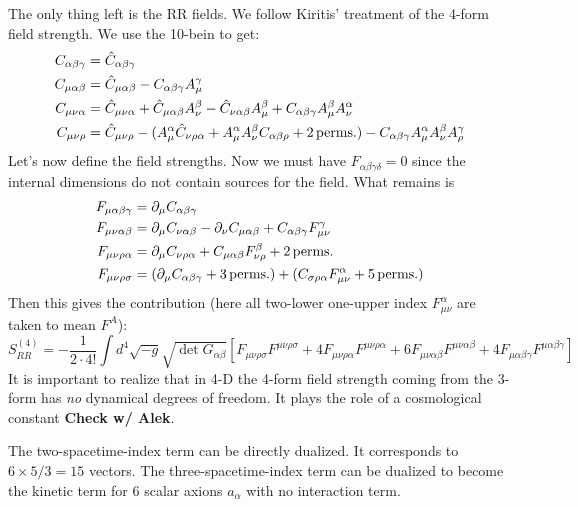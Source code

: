 \documentclass[11pt, class=article, crop=false]{standalone}
\begin{document}
\begin{enumerate}
	The only thing left is the RR fields. We follow Kiritis' treatment of the 4-form field strength. We use the 10-bein to get: 
	\[
		\begin{aligned}
			C_{\alpha \beta \gamma} &= \hat C_{\alpha \beta \gamma}\\
			C_{\mu \alpha \beta} &= \hat C_{\mu \alpha \beta} - C_{\alpha \beta \gamma} A^\gamma_\mu\\
			C_{\mu \nu \alpha} &= \hat C_{\mu \nu \alpha} + \hat C_{\mu \alpha \beta} A^\beta_\nu  - \hat C_{\nu \alpha \beta} A^\beta_\mu + C_{\alpha \beta \gamma} A^\beta_\mu A^\alpha_\nu\\
			C_{\mu \nu \rho} &= \hat C_{\mu \nu \rho} - (A_{\mu}^\alpha \hat C_{\nu \rho \alpha} + A_\mu^\alpha A_\nu^\beta C_{\alpha \beta \rho} + 2 \,\mathrm{perms.}) - C_{\alpha \beta \gamma} A^\alpha_\mu A^\beta_\nu A^\gamma_\rho
		\end{aligned}
	\]
	Let's now define the field strengths. Now we must have $F_{\alpha \beta \gamma \delta}= 0$ since the internal dimensions do not contain sources for the field. What remains is
	\[
	\begin{aligned}
		F_{\mu \alpha \beta \gamma} &= \partial_\mu C_{\alpha \beta \gamma}\\
		F_{\mu \nu \alpha \beta} &= \partial_\mu C_{\nu \alpha \beta} - \partial_\nu C_{\mu \alpha \beta} + C_{\alpha \beta \gamma} F_{\mu \nu}^\gamma\\
		F_{\mu \nu \rho \alpha} &= \partial_\mu C_{\nu \rho \alpha} + C_{\mu \alpha \beta} F^{\beta}_{\nu \rho} + 2 \,\mathrm{perms.}\\
		F_{\mu \nu \rho \sigma} &= (\partial_\mu C_{\alpha \beta \gamma} + 3 \,\mathrm{perms.}) + (C_{\sigma \rho \alpha} F^\alpha_{\mu \nu} + 5 \,\mathrm{perms.})\\
	\end{aligned}
	\]
	Then this gives the contribution (here all two-lower one-upper index $F_{\mu \nu}^\alpha$ are taken to mean $F^A$):
	\[
		S_{RR}^{(4)} = -\frac{1}{2 \cdot 4!} \int d^4 \sqrt{-g} \sqrt{\det G_{\alpha \beta}} [F_{\mu \nu \rho \sigma} F^{\mu \nu \rho \sigma} + 4 F_{\mu \nu \rho \alpha} F^{\mu \nu \rho \alpha} + 6 F_{\mu \nu \alpha \beta} F^{\mu \nu \alpha \beta} +4 F_{\mu \alpha \beta \gamma} F^{\mu \alpha \beta \gamma}]
	\]
	It is important to realize that in 4-D the 4-form field strength coming from the 3-form has \emph{no} dynamical degrees of freedom. It plays the role of a cosmological constant \textbf{Check w/ Alek}.
	
	The two-spacetime-index term can be directly dualized. It corresponds to $6 \times 5/3= 15$ vectors.	The three-spacetime-index term can be dualized to become the kinetic term for $6$ scalar axions $a_\alpha$ with no interaction term.
	

\end{enumerate}
\end{document}
